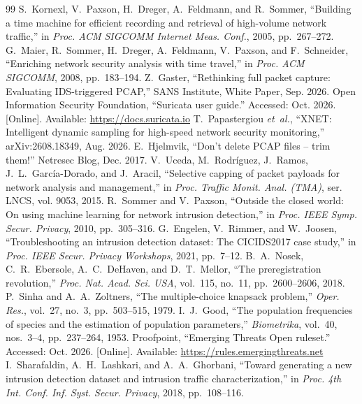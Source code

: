 \documentclass[conference]{IEEEtran}
\begin{document}
\begin{thebibliography}{99}
 S.~Kornexl, V.~Paxson, H.~Dreger, A.~Feldmann, and R.~Sommer, ``Building a time machine for efficient recording and retrieval of high-volume network traffic,'' in \emph{Proc. ACM SIGCOMM Internet Meas. Conf.}, 2005, pp.~267--272.
 G.~Maier, R.~Sommer, H.~Dreger, A.~Feldmann, V.~Paxson, and F.~Schneider, ``Enriching network security analysis with time travel,'' in \emph{Proc. ACM SIGCOMM}, 2008, pp.~183--194.
 Z.~Gaster, ``Rethinking full packet capture: Evaluating IDS-triggered PCAP,'' SANS Institute, White Paper, Sep. 2026.
 Open Information Security Foundation, ``Suricata user guide.'' Accessed: Oct. 2026. [Online]. Available: \url{https://docs.suricata.io}
 T.~Papastergiou \emph{et~al.}, ``XNET: Intelligent dynamic sampling for high-speed network security monitoring,'' arXiv:2608.18349, Aug. 2026.
 E.~Hjelmvik, ``Don't delete PCAP files -- trim them!'' Netresec Blog, Dec. 2017.
 V.~Uceda, M.~Rodr\'iguez, J.~Ramos, J.~L.~Garc\'ia-Dorado, and J.~Aracil, ``Selective capping of packet payloads for network analysis and management,'' in \emph{Proc. Traffic Monit. Anal. (TMA)}, ser. LNCS, vol. 9053, 2015.
 R.~Sommer and V.~Paxson, ``Outside the closed world: On using machine learning for network intrusion detection,'' in \emph{Proc. IEEE Symp. Secur. Privacy}, 2010, pp.~305--316.
 G.~Engelen, V.~Rimmer, and W.~Joosen, ``Troubleshooting an intrusion detection dataset: The CICIDS2017 case study,'' in \emph{Proc. IEEE Secur. Privacy Workshops}, 2021, pp.~7--12.
 B.~A.~Nosek, C.~R.~Ebersole, A.~C.~DeHaven, and D.~T.~Mellor, ``The preregistration revolution,'' \emph{Proc. Nat. Acad. Sci. USA}, vol.~115, no.~11, pp.~2600--2606, 2018.
 P.~Sinha and A.~A.~Zoltners, ``The multiple-choice knapsack problem,'' \emph{Oper. Res.}, vol.~27, no.~3, pp.~503--515, 1979.
 I.~J.~Good, ``The population frequencies of species and the estimation of population parameters,'' \emph{Biometrika}, vol.~40, nos.~3--4, pp.~237--264, 1953.
 Proofpoint, ``Emerging Threats Open ruleset.'' Accessed: Oct. 2026. [Online]. Available: \url{https://rules.emergingthreats.net}
 I.~Sharafaldin, A.~H.~Lashkari, and A.~A.~Ghorbani, ``Toward generating a new intrusion detection dataset and intrusion traffic characterization,'' in \emph{Proc. 4th Int. Conf. Inf. Syst. Secur. Privacy}, 2018, pp.~108--116.

\end{thebibliography}
\end{document}
